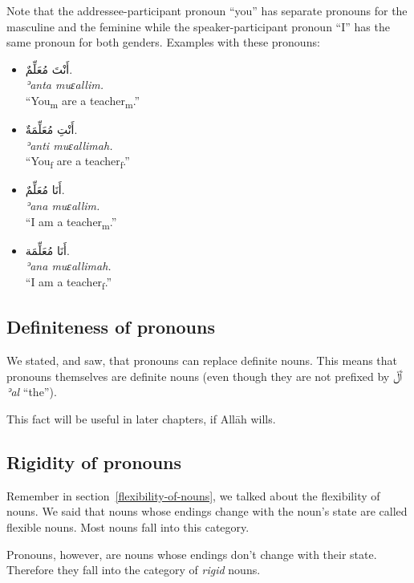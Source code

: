 \documentclass[
  10pt,
]{book}
\begin{document}
Note that the addressee-participant pronoun \enquote{you} has separate pronouns for the masculine and the feminine while the speaker-participant pronoun \enquote{I} has the same pronoun for both genders. Examples with these pronouns:

\begin{itemize}
\item
  \foreignlanguage{arabic}{أَنْتَ مُعَلِّمٌ.}\\
  \emph{ʾanta muɛallim.}\\
  \enquote{You\textsubscript{m} are a teacher\textsubscript{m}.}
\item
  \foreignlanguage{arabic}{أَنْتِ مُعَلِّمَةٌ.}\\
  \emph{ʾanti muɛallimah.}\\
  \enquote{You\textsubscript{f} are a teacher\textsubscript{f}.}
\item
  \foreignlanguage{arabic}{أَنَا مُعَلِّمٌ.}\\
  \emph{ʾana muɛallim.}\\
  \enquote{I am a teacher\textsubscript{m}.}
\item
  \foreignlanguage{arabic}{أَنَا مُعَلِّمَة.}\\
  \emph{ʾana muɛallimah.}\\
  \enquote{I am a teacher\textsubscript{f}.}
\end{itemize}

\subsection{Definiteness of pronouns}\label{definiteness-of-pronouns}

We stated, and saw, that pronouns can replace definite nouns. This means that pronouns themselves are definite nouns (even though they are not prefixed by \foreignlanguage{arabic}{ٱَلْ} \emph{ʾal} \enquote{the}).

This fact will be useful in later chapters, if Allāh wills.

\subsection{Rigidity of pronouns}\label{rigidity-of-pronouns}

Remember in section~\ref{flexibility-of-nouns}, we talked about the flexibility of nouns. We said that nouns whose endings change with the noun's state are called flexible nouns. Most nouns fall into this category.

Pronouns, however, are nouns whose endings don't change with their state. Therefore they fall into the category of \emph{rigid} nouns.
\end{document}

